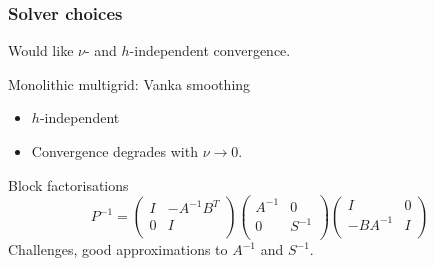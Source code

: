 \documentclass[presentation]{beamer}
\newcommand{\cmark}{\ding{51}}
\newcommand{\xmark}{\ding{55}}
\begin{document}
\begin{frame}
  \frametitle{Solver choices}
  Would like $\nu$- and $h$-independent convergence.
  \begin{block}{Monolithic multigrid: Vanka smoothing}
    \begin{itemize}
    \item[\cmark] $h$-independent
    \item[\xmark] Convergence degrades with $\nu \to 0$.
    \end{itemize}
  \end{block}
  \begin{block}{Block factorisations}
    \begin{equation*}
      P^{-1} =
      \begin{pmatrix}
        I   & -A^{-1} B^T \\
        0 & I \\
      \end{pmatrix}
      \begin{pmatrix}
        A^{-1}  & 0 \\
        0 & S^{-1} \\
      \end{pmatrix}
      \begin{pmatrix}
        I   & 0 \\
        -BA^{-1} & I \\
      \end{pmatrix}
    \end{equation*}
    Challenges, good approximations to $A^{-1}$ and $S^{-1}$.
  \end{block}
\end{frame}
\end{document}

